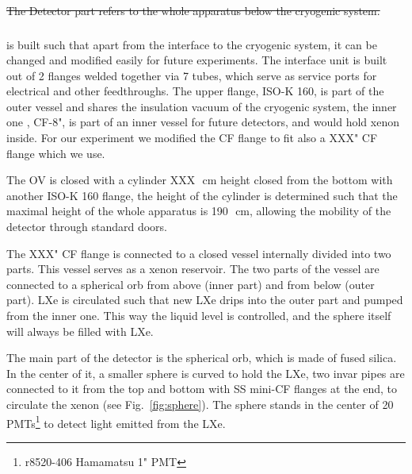 \st{The Detector part refers to the whole apparatus below the cryogenic system.} 

\subsubsection{}
\label{subsubsec:detchamber}

 is built such that apart from the interface to 
the cryogenic system, it can be changed and modified easily for future experiments.
The interface unit is built out of 2 flanges welded together via 7 tubes, which serve as service ports for electrical and other feedthroughs. 
The upper flange, ISO-K 160, is part of the outer vessel and shares the insulation vacuum of the cryogenic system, the inner one , CF-8", is 
part of an inner vessel for future detectors, and would hold xenon inside. For our experiment we modified the CF flange to fit also a XXX" CF 
flange which we use.

The OV is closed with a cylinder XXX~\,cm height closed from the bottom with another ISO-K 160 flange, the height of the cylinder is determined 
such that the maximal height of the whole apparatus is 190~\,cm, allowing the mobility of the detector through standard doors.
 
The XXX" CF flange is connected to a closed vessel internally divided into two parts. This vessel serves as a xenon reservoir. The two parts of 
the vessel are connected to a spherical orb from above (inner part) and from below (outer part). LXe is circulated such that new LXe drips into 
the outer part and pumped from the inner one. This way the liquid level is controlled, and the sphere itself will always be filled with LXe. 

The main part of the detector is the spherical orb, which is made of fused silica. In the center of it, a smaller sphere is curved to hold the 
LXe, two invar pipes are connected to it from the top and bottom with SS mini-CF flanges at the end, to circulate the xenon (see Fig.~\ref{fig:sphere}). 
The sphere stands in the center of 20 PMTs\footnote{r8520-406 Hamamatsu 1" PMT} to detect light emitted from the LXe.

